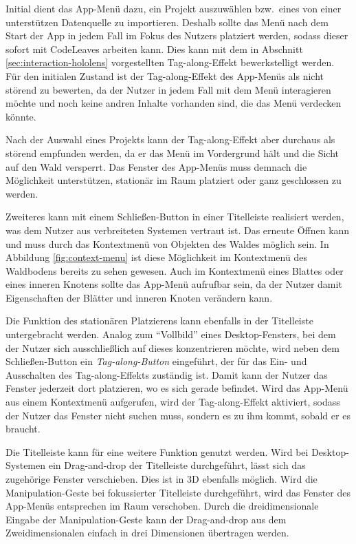 Initial dient das App-Menü dazu, ein Projekt auszuwählen bzw.\ eines von einer unterstützen Datenquelle zu importieren. Deshalb sollte das Menü nach dem Start der App in jedem Fall im Fokus des Nutzers platziert werden, sodass dieser sofort mit CodeLeaves arbeiten kann. Dies kann mit dem in Abschnitt \ref{sec:interaction-hololens} vorgestellten Tag-along-Effekt bewerkstelligt werden. Für den initialen Zustand ist der Tag-along-Effekt des App-Menüs als nicht störend zu bewerten, da der Nutzer in jedem Fall mit dem Menü interagieren möchte und noch keine andren Inhalte vorhanden sind, die das Menü verdecken könnte.

Nach der Auswahl eines Projekts kann der Tag-along-Effekt aber durchaus als störend empfunden werden, da er das Menü im Vordergrund hält und die Sicht auf den Wald versperrt. Das Fenster des App-Menüs muss demnach die Möglichkeit unterstützen, stationär im Raum platziert oder ganz geschlossen zu werden.

Zweiteres kann mit einem Schließen-Button in einer Titelleiste realisiert werden, was dem Nutzer aus verbreiteten Systemen vertraut ist. Das erneute Öffnen kann und muss durch das Kontextmenü von Objekten des Waldes möglich sein. In Abbildung \ref{fig:context-menu} ist diese Möglichkeit im Kontextmenü des Waldbodens bereits zu sehen gewesen. Auch im Kontextmenü eines Blattes oder eines inneren Knotens sollte das App-Menü aufrufbar sein, da der Nutzer damit Eigenschaften der Blätter und inneren Knoten verändern kann.

Die Funktion des stationären Platzierens kann ebenfalls in der Titelleiste untergebracht werden. Analog zum "`Vollbild"' eines Desktop-Fensters, bei dem der Nutzer sich ausschließlich auf dieses konzentrieren möchte, wird neben dem Schließen-Button ein \textit{Tag-along-Button} eingeführt, der für das Ein- und Ausschalten des Tag-along-Effekts zuständig ist. Damit kann der Nutzer das Fenster jederzeit dort platzieren, wo es sich gerade befindet. Wird das App-Menü aus einem Kontextmenü aufgerufen, wird der Tag-along-Effekt aktiviert, sodass der Nutzer das Fenster nicht suchen muss, sondern es zu ihm kommt, sobald er es braucht.

Die Titelleiste kann für eine weitere Funktion genutzt werden. Wird bei Desktop-Systemen ein Drag-and-drop der Titelleiste durchgeführt, lässt sich das zugehörige Fenster verschieben. Dies ist in 3D ebenfalls möglich. Wird die Manipulation-Geste bei fokussierter Titelleiste durchgeführt, wird das Fenster des App-Menüs entsprechen im Raum verschoben. Durch die dreidimensionale Eingabe der Manipulation-Geste kann der Drag-and-drop aus dem Zweidimensionalen einfach in drei Dimensionen übertragen werden.

